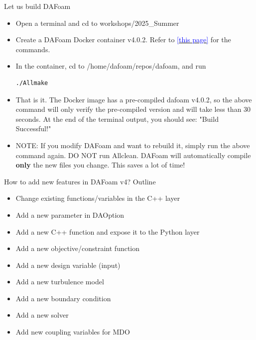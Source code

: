 \documentclass{bredelebeamer}
\begin{document}
\begin{frame}[fragile]{Let us build DAFoam}


\begin{itemize}
  \setlength\itemsep{0.5em}
  \item Open a terminal and cd to workshops/2025\_Summer
 \item Create a DAFoam Docker container v4.0.2. Refer to \href{https://dafoam.github.io/mydoc_get_started_run.html}{\textcolor{blue}{[this page]}} for the commands.
 \item In the container, cd to /home/dafoam/repos/dafoam, and run
 \begin{lstlisting}
./Allmake
 \end{lstlisting}
 \item That is it. The Docker image has a pre-compiled dafoam v4.0.2, so the above command will only verify the pre-compiled version and will take less than 30 seconds. At the end of the terminal output, you should see: "Build Successful!"
 \item NOTE: If you modify DAFoam and want to rebuild it, simply run the above command again. DO NOT run Allclean. DAFoam will automatically compile \textbf{only} the new files you change. This saves a lot of time!
\end{itemize}
  
\end{frame}


\begin{frame}{How to add new features in DAFoam v4?}
  Outline
  \begin{itemize}
  \item Change existing functions/variables in the C++ layer
  \item Add a new parameter in DAOption
  \item Add a new C++ function and expose it to the Python layer
  \item Add a new objective/constraint function
  \item Add a new design variable (input)
  \item Add a new turbulence model
  \item Add a new boundary condition
  \item Add a new solver
  \item Add new coupling variables for MDO
    
\end{itemize}
\end{frame}
\end{document}

